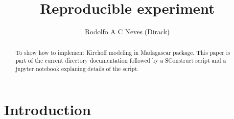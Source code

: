 \title{Reproducible experiment}

\author{Rodolfo A C Neves (Dirack)}
\begin{abstract}
To show how to implement Kirchoff modeling in Madagascar
package. This paper is part of the current directory 
documentation followed by a SConstruct script and a jupyter
notebook explaning details of the script.
\end{abstract}

\section{Introduction}



